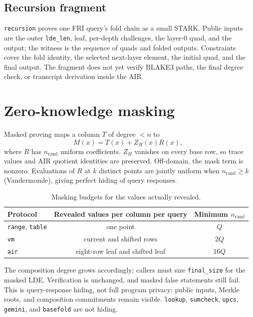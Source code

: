 \documentclass[11pt,a4paper]{article}
\begin{document}
\subsection{Recursion fragment}

\texttt{recursion} proves one FRI query's fold chain as a small STARK. Public
inputs are the outer \texttt{lde\_len}, leaf, per-depth challenges, the
layer-0 quad, and the output; the witness is the sequence of quads and folded
outputs. Constraints cover the fold identity, the selected next-layer element,
the initial quad, and the final output. The fragment does not yet verify
BLAKE3 paths, the final degree check, or transcript derivation inside the AIR.

\section{Zero-knowledge masking}

Masked proving maps a column $T$ of degree $<n$ to
\[
M(x)=T(x)+Z_H(x)R(x),
\]
where $R$ has $n_{\mathrm{rand}}$ uniform coefficients. $Z_H$ vanishes on
every base row, so trace values and AIR quotient identities are preserved.
Off-domain, the mask term is nonzero. Evaluations of $R$ at $k$ distinct
points are jointly uniform when $n_{\mathrm{rand}}\ge k$ (Vandermonde),
giving perfect hiding of query responses.

\begin{table}[h]
\centering
\small
\begin{tabular}{@{}lcc@{}}
\toprule
Protocol & Revealed values per column per query & Minimum $n_{\mathrm{rand}}$ \\
\midrule
\texttt{range}, \texttt{table} & one point & $Q$ \\
\texttt{vm} & current and shifted rows & $2Q$ \\
\texttt{air} & eight-row leaf and shifted leaf & $16Q$ \\
\bottomrule
\end{tabular}
\caption{Masking budgets for the values actually revealed.}
\end{table}

The composition degree grows accordingly; callers must size
\texttt{final\_size} for the masked LDE. Verification is unchanged, and
masked false statements still fail. This is query-response hiding, not full
program privacy: public inputs, Merkle roots, and composition commitments
remain visible. \texttt{lookup}, \texttt{sumcheck}, \texttt{upcs},
\texttt{gemini}, and \texttt{basefold} are not hiding.
\end{document}
